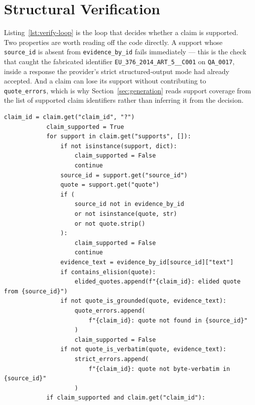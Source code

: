 \section{Structural Verification}

Listing~\ref{lst:verify-loop} is the loop that decides whether a claim is
supported. Two properties are worth reading off the code directly. A support
whose \texttt{source\_id} is absent from \texttt{evidence\_by\_id} fails
immediately --- this is the check that caught the fabricated identifier
\texttt{EU\_376\_2014\_ART\_5\_\_C001} on \texttt{QA\_0017}, inside a response
the provider's strict structured-output mode had already accepted. And a claim
can lose its support without contributing to \texttt{quote\_errors}, which is
why Section~\ref{sec:generation} reads support coverage from the list of
supported claim identifiers rather than inferring it from the decision.

\begin{lstlisting}[style=thesis,caption={The support loop: supplied-source admissibility, contiguity, and the byte-level second opinion. Source: \texttt{src/aviation\_rag/generation/verification.py}, lines 105--132.},label={lst:verify-loop}]
            claim_id = claim.get("claim_id", "?")
            claim_supported = True
            for support in claim.get("supports", []):
                if not isinstance(support, dict):
                    claim_supported = False
                    continue
                source_id = support.get("source_id")
                quote = support.get("quote")
                if (
                    source_id not in evidence_by_id
                    or not isinstance(quote, str)
                    or not quote.strip()
                ):
                    claim_supported = False
                    continue
                evidence_text = evidence_by_id[source_id]["text"]
                if contains_elision(quote):
                    elided_quotes.append(f"{claim_id}: elided quote from {source_id}")
                if not quote_is_grounded(quote, evidence_text):
                    quote_errors.append(
                        f"{claim_id}: quote not found in {source_id}"
                    )
                    claim_supported = False
                if not quote_is_verbatim(quote, evidence_text):
                    strict_errors.append(
                        f"{claim_id}: quote not byte-verbatim in {source_id}"
                    )
            if claim_supported and claim.get("claim_id"):
\end{lstlisting}

